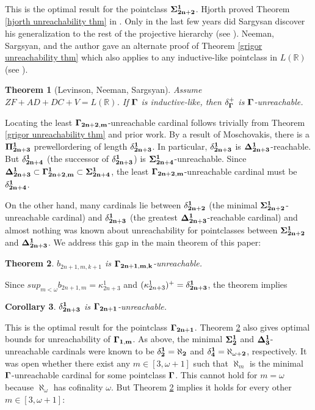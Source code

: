 \documentclass[12pt]{article}
\newtheorem{theorem}{Theorem}[section]
\newtheorem{corollary}[theorem]{Corollary}
\newcommand\R{\mathbb{R}}
\begin{document}
{This is the optimal result for the pointclass $\bf{\Sigma^1_{2n+2}}$. Hjorth proved Theorem \ref{hjorth unreachability thm} in \cite{twoapp}. Only in the last few years did Sargysan discover his generalization to the rest of the projective hierarchy (see \cite{hra}). Neeman, Sargsyan, and the author gave an alternate proof of Theorem \ref{grigor unreachability thm} which also applies to any inductive-like pointclass in $L(\R)$ (see \cite{phdthesis}).

\begin{theorem}[Levinson, Neeman, Sargsyan]
\label{ind-like thm}
    Assume $ZF +AD + DC + V=L(\R)$. If $\bf{\Gamma}$ is inductive-like, then $\bf{\delta_\Gamma^+}$ is $\bf{\Gamma}$-unreachable.
\end{theorem}

Locating the least $\bf{\Gamma_{2n+2,m}}$-unreachable cardinal follows trivially from Theorem \ref{grigor unreachability thm} and prior work. By a result of Moschovakis, there is a $\bf{\Pi^1_{2n+3}}$ prewellordering of length $\bf{\delta^1_{2n+3}}$. In particular, $\bf{\delta^1_{2n+3}}$ is $\bf{\Delta^1_{2n+3}}$-reachable. But $\bf{\delta^1_{2n+4}}$ (the successor of $\bf{\delta^1_{2n+3}}$) is $\bf{\Sigma^1_{2n+4}}$-unreachable. Since $\bf{\Delta^1_{2n+3}} \subset \bf{\Gamma^1_{2n+2,m}} \subset \bf{\Sigma^1_{2n+4}}$, the least $\bf{\Gamma_{2n+2,m}}$-unreachable cardinal must be $\bf{\delta^1_{2n+4}}$.

On the other hand, many cardinals lie between $\bf{\delta^1_{2n+2}}$ (the minimal $\bf{\Sigma^1_{2n+2}}$-unreachable cardinal) and $\bf{\delta^1_{2n+3}}$ (the greatest $\bf{\Delta^1_{2n+3}}$-reachable cardinal) and almost nothing was known about unreachability for pointclasses between $\bf{\Sigma^1_{2n+2}}$ and $\bf{\Delta^1_{2n+3}}$. We address this gap in the main theorem of this paper:

\begin{theorem}
\label{main thm}
    $b_{2n+1,m,k+1}$ is $\bf{\Gamma_{2n+1,m,k}}$-unreachable.
\end{theorem}

Since $sup_{m<\omega} b_{2n+1,m} = \kappa^1_{2n+3}$ and $(\kappa^1_{2n+3})^+ = \bf{\delta^1_{2n+3}}$, the theorem implies 

\begin{corollary}
\label{main cor}
    $\bf{\delta^1_{2n+3}}$ is $\bf{\Gamma_{2n+1}}$-unreachable.
\end{corollary}

This is the optimal result for the pointclass $\bf{\Gamma_{2n+1}}$. Theorem \ref{main thm} also gives optimal bounds for unreachability of  $\bf{\Gamma_{1,m}}$. As above, the minimal $\bf{\Sigma^1_2}$ and $\bf{\Delta^1_3}$-unreachable cardinals were known to be $\bf{\delta^1_2} = \aleph_2$ and $\bf{\delta^1_4} = \aleph_{\omega+2}$, respectively. It was open whether there exist any $m\in [3,\omega+1]$ such that $\aleph_m$ is the minimal $\bf{\Gamma}$-unreachable cardinal for some pointclass $\bf{\Gamma}$. This cannot hold for $m=\omega$ because $\aleph_\omega$ has cofinality $\omega$. But Theorem \ref{main thm} implies it holds for every other $m\in[3,\omega+1]$:

}
\end{document}
